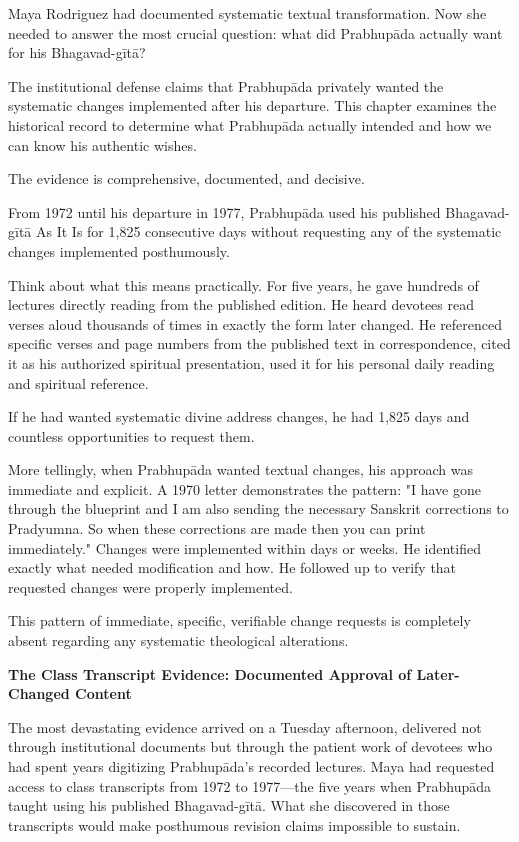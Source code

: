 \documentclass[12pt,twoside]{book}
\begin{document}
\normalfont\justifying
Maya Rodriguez had documented systematic textual transformation. Now she needed to answer the most crucial question: what did Prabhupāda actually want for his Bhagavad-gītā?

The institutional defense claims that Prabhupāda privately wanted the systematic changes implemented after his departure. This chapter examines the historical record to determine what Prabhupāda actually intended and how we can know his authentic wishes.

The evidence is comprehensive, documented, and decisive.


From 1972 until his departure in 1977, Prabhupāda used his published Bhagavad-gītā As It Is for 1,825 consecutive days without requesting any of the systematic changes implemented posthumously.

Think about what this means practically. For five years, he gave hundreds of lectures directly reading from the published edition. He heard devotees read verses aloud thousands of times in exactly the form later changed. He referenced specific verses and page numbers from the published text in correspondence, cited it as his authorized spiritual presentation, used it for his personal daily reading and spiritual reference.

If he had wanted systematic divine address changes, he had 1,825 days and countless opportunities to request them.

More tellingly, when Prabhupāda wanted textual changes, his approach was immediate and explicit. A 1970 letter demonstrates the pattern: "I have gone through the blueprint and I am also sending the necessary Sanskrit corrections to Pradyumna. So when these corrections are made then you can print immediately." Changes were implemented within days or weeks. He identified exactly what needed modification and how. He followed up to verify that requested changes were properly implemented.

This pattern of immediate, specific, verifiable change requests is completely absent regarding any systematic theological alterations.


\vspace{0.5cm}
\textbf{The Class Transcript Evidence: Documented Approval of Later-Changed Content}
\vspace{0.2cm}


The most devastating evidence arrived on a Tuesday afternoon, delivered not through institutional documents but through the patient work of devotees who had spent years digitizing Prabhupāda's recorded lectures. Maya had requested access to class transcripts from 1972 to 1977—the five years when Prabhupāda taught using his published Bhagavad-gītā. What she discovered in those transcripts would make posthumous revision claims impossible to sustain.
\end{document}
